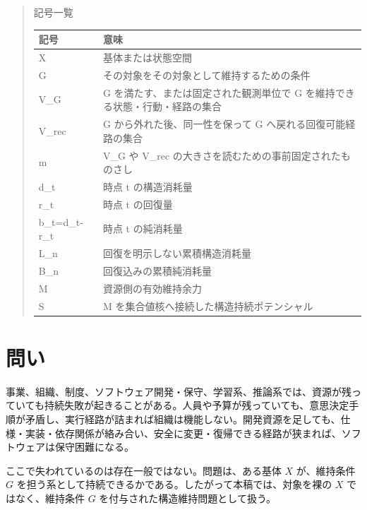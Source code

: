 \documentclass[12pt,a4paper]{article}
\begin{document}
\begin{abstract}
記号一覧

{\def\LTcaptype{table} %
\begin{longtable}[]{@{}
  >{\raggedright\arraybackslash}p{}
  >{\raggedright\arraybackslash}p{}@{}}
\toprule\noalign{}
\begin{minipage}[b]{\linewidth}\raggedright
記号
\end{minipage} & \begin{minipage}[b]{\linewidth}\raggedright
意味
\end{minipage} \\
\midrule\noalign{}
\endhead
\bottomrule\noalign{}
\endlastfoot
X & 基体または状態空間 \\
G & その対象をその対象として維持するための条件 \\
V\_G & G を満たす、または固定された観測単位で G を維持できる状態・行動・経路の集合 \\
V\_rec & G から外れた後、同一性を保って G へ戻れる回復可能経路の集合 \\
m & V\_G や V\_rec の大きさを読むための事前固定されたものさし \\
d\_t & 時点 t の構造消耗量 \\
r\_t & 時点 t の回復量 \\
b\_t=d\_t-r\_t & 時点 t の純消耗量 \\
L\_n & 回復を明示しない累積構造消耗量 \\
B\_n & 回復込みの累積純消耗量 \\
M & 資源側の有効維持余力 \\
S & M を集合値核へ接続した構造持続ポテンシャル \\
\end{longtable}
}
\end{abstract}

\section{問い}\label{ux554fux3044}

事業、組織、制度、ソフトウェア開発・保守、学習系、推論系では、資源が残っていても持続失敗が起きることがある。人員や予算が残っていても、意思決定手順が矛盾し、実行経路が詰まれば組織は機能しない。開発資源を足しても、仕様・実装・依存関係が絡み合い、安全に変更・復帰できる経路が狭まれば、ソフトウェアは保守困難になる。

ここで失われているのは存在一般ではない。問題は、ある基体 \(X\) が、維持条件 \(G\) を担う系として持続できるかである。したがって本稿では、対象を裸の \(X\) ではなく、維持条件 \(G\) を付与された構造維持問題として扱う。
\end{document}

